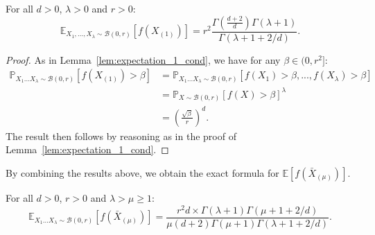 \begin{lemma}\label{lem:expectation_1}\label{lm5}
For all $d>0$, $\lambda>0$ and $r>0$:
 $$\mathbb{E}_{X_1,...,X_\lambda\sim\mathcal{B}(0,r)}\left[ f(X_{(1)})\right]=r^2\frac{\Gamma(\frac{d+2}{d})\Gamma(\lambda+1)}{\Gamma(\lambda+1+2/d)}.$$
\end{lemma}
\begin{proof}
As in Lemma~\ref{lem:expectation_1_cond}, we have for any 
$\beta \in (0,r^2]$:
\begin{align*}
\mathbb{P}_{X_{1}\ldots X_{\lambda}\sim\mathcal{B}(0,r)}\left[f\left(X_{(1)}\right)>\beta\right] &=\mathbb{P}_{X_{1}\ldots X_{\lambda}\sim\mathcal{B}(0,r)}\left[f\left(X_{1}\right)>\beta,...,f\left(X_{\lambda}\right)>\beta\right]\\
&=\mathbb{P}_{X\sim\mathcal{B}(0,r)}\left[f\left(X\right)>\beta\right]^\lambda\\
&= \left(\frac{\sqrt{\beta}}{r}\right)^{d}.
\end{align*}
The result then follows by reasoning as in the proof of Lemma~\ref{lem:expectation_1_cond}. 
\end{proof}
By combining the results above, we obtain the exact formula for 
$\mathbb{E}\left[ f(\bar X_{(\mu)})\right]$.
\begin{thm}\label{thm:formula_k_best}
For all $d>0$, $r>0$ and $\lambda >\mu \ge 1$:
$$\mathbb{E}_{X_{1}\ldots X_{\lambda}\sim\mathcal{B}(0,r)}\left[ f(\bar X_{(\mu)})\right]=\frac{r^2d\times\Gamma(\lambda+1)\Gamma(\mu+1+2/d)}{\mu(d+2)\Gamma(\mu+1)\Gamma(\lambda+1+2/d)}.$$
\end{thm}
